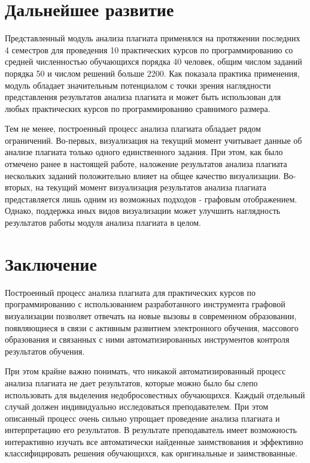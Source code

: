 \documentclass[a4paper,14pt]{extarticle}
\begin{document}
\section{Дальнейшее развитие}

Представленный модуль анализа плагиата применялся на протяжении последних 4 семестров для проведения 10 практических курсов по программированию со средней численностью обучающихся порядка 40 человек, общим числом заданий порядка 50 и числом решений больше 2200. Как показала практика применения, модуль обладает значительным потенциалом с точки зрения наглядности представления результатов анализа плагиата и может быть использован для любых практических курсов по программированию сравнимого размера.

Тем не менее, построенный процесс анализа плагиата обладает рядом ограничений. Во-первых, визуализация на текущий момент учитывает данные об анализе плагиата только одного единственного задания. При этом, как было отмечено ранее в настоящей работе, наложение результатов анализа плагиата нескольких заданий положительно влияет на общее качество визуализации. Во-вторых, на текущий момент визуализация результатов анализа плагиата представляется лишь одним из возможных подходов - графовым отображением. Однако, поддержка иных видов визуализации может улучшить наглядность результатов работы модуля анализа плагиата в целом.

\section{Заключение}

Построенный процесс анализа плагиата для практических курсов по программированию с использованием разработанного инструмента графовой визуализации позволяет отвечать на новые вызовы в современном образовании, появляющиеся в связи с активным развитием электронного обучения, массового образования и связанных с ними автоматизированных инструментов контроля результатов обучения.

При этом крайне важно понимать, что никакой автоматизированный процесс анализа плагиата не дает результатов, которые можно было бы слепо использовать для выделения недобросовестных обучающихся. Каждый отдельный случай должен индивидуально исследоваться преподавателем. При этом описанный процесс очень сильно упрощает проведение анализа плагиата и интерпретацию его результатов. В результате преподаватель имеет возможность интерактивно изучать все автоматически найденные заимствования и эффективно классифицировать решения обучающихся, как оригинальные и заимствованные.



\end{document}
